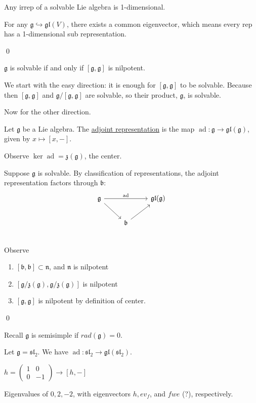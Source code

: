 \documentclass[x11names,reqno,14pt]{extarticle}
\newcommand{\pmat}[4]{\begin{pmatrix} #1 & #2 \\ #3 & #4 \end{pmatrix}}
\newcommand{\mk}[1]{\mathfrak{#1}}
\newcommand{\g}{\mk{g}}
\newcommand{\rad}{rad}
\DeclareMathOperator{\ad}{ad}
\newcommand{\into}{\hookrightarrow}
\newcommand{\gl}{\mk{g}\mk{l}}
\renewcommand{\sl}{\mk{s}\mk{l}}
\begin{document}
\cor

Any irrep of a solvable Lie algebra is 1-dimensional. 

\proof

For any $\g\into\gl(V)$, there exists a common eigenvector, which means every rep has a 1-dimensional sub representation. 

\qed

\cor

$\g$ is solvable if and only if $[\g,\g]$ is nilpotent. 

\proof

We start with the easy direction: it is enough for $[\g,\g]$ to be solvable. Because then $[\g,\g]$ and $\g/[\g,\g]$ are solvable, so their product, $\g$, is solvable. 

Now for the other direction. 


Let $\g$ be a Lie algebra. The \underline{adjoint representation} is the map $\ad:\g\to\gl(\g)$, given by $x\mapsto[x,-]$.

Observe $\ker\ad = \mk{z}(\g)$, the center. 

Suppose $\g$ is solvable. By classification of representations, the adjoint representation factors through $\mk{b}$:
\[
\begin{tikzcd}
\g\ar[dr] \ar[rr, "\ad"] & & \gl(\g) \\
& \mk{b} \ar[ur] & \\
\end{tikzcd}
\]
Observe
\begin{enumerate}[label=(\roman*)]

\item $[\mk{b},\mk{b}] \subset \mk{n}$, and $\mk{n}$ is nilpotent

\item $[\g/\mk{z}(\g), \g/\mk{z}(\g)]$ is nilpotent

\item $[\g,\g]$ is nilpotent by definition of center. 

\end{enumerate}

\qed

Recall $\g$ is semisimple if $\rad(\g)=0$.

\exm

Let $\g = \sl_2$. We have $\ad:\sl_2\to\gl(\sl_2)$.

$h = \pmat{1}{0}{0}{-1}\to[h,-]$

Eigenvalues of $0, 2, -2$, with eigenvectors $h, ev_f$, and $fwe$ (?), respectively.
\end{document}

